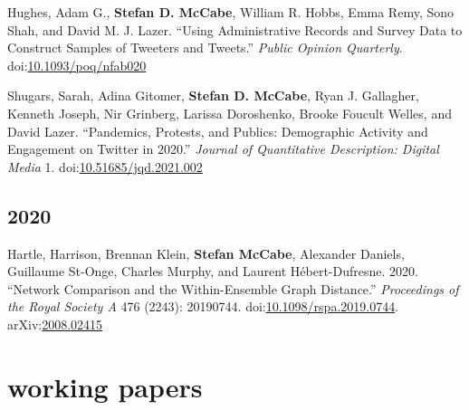 \documentclass[11pt, letter]{article}
\begin{document}
\begin{hangparas}{.25in}{1}
Hughes, Adam G.,\textsuperscript{\textdagger} \textbf{Stefan D. McCabe},\textsuperscript{\textdagger} William R. Hobbs, Emma Remy, Sono Shah, and David M. J. Lazer.  ``Using Administrative Records and Survey Data to Construct Samples of Tweeters and Tweets.'' \textit{Public Opinion Quarterly}. doi:\href{https://doi.org/10.1093/poq/nfab020}{10.1093/poq/nfab020} \vspace{2mm}

Shugars, Sarah, Adina Gitomer, \textbf{Stefan D. McCabe}, Ryan J. Gallagher, Kenneth Joseph, Nir Grinberg, Larissa Doroshenko, Brooke Foucult Welles, and David Lazer. ``Pandemics, Protests, and Publics: Demographic Activity and Engagement on Twitter in 2020.'' \textit{Journal of Quantitative Description: Digital Media} 1. doi:\href{https://doi.org/10.51685/jqd.2021.002}{10.51685/jqd.2021.002}

\end{hangparas}
\subsection{2020}

\begin{hangparas}{.25in}{1}
Hartle, Harrison, Brennan Klein, \textbf{Stefan McCabe}, Alexander Daniels, Guillaume St-Onge, Charles Murphy, and Laurent Hébert-Dufresne. 2020. ``Network Comparison and the Within-Ensemble Graph Distance.'' \textit{Proceedings of the Royal Society A} 476 (2243): 20190744. doi:\href{https://doi.org/10.1098/rspa.2019.0744}{10.1098/rspa.2019.0744}. arXiv:\href{https://arxiv.org/abs/2008.02415}{2008.02415}
\vspace{2mm}

\end{hangparas}
\section{working papers}
\end{document}
